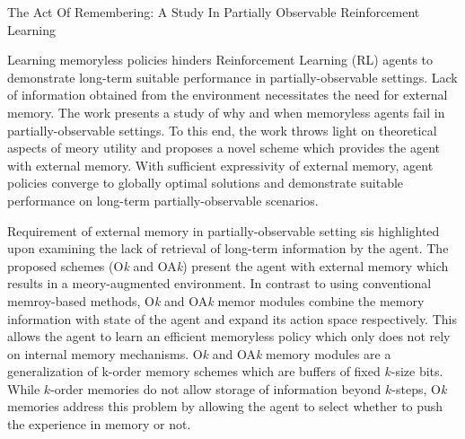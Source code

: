 \documentclass[11pt,letterpaper]{article}
\begin{document}
\begin{center}
  \large{The Act Of Remembering: A Study In Partially Observable Reinforcement Learning}
\end{center}

Learning memoryless policies hinders Reinforcement Learning (RL) agents to demonstrate long-term suitable performance in partially-observable settings. Lack of information obtained from the environment necessitates the need for external memory. The work presents a study of why and when memoryless agents fail in partially-observable settings. To this end, the work throws light on theoretical aspects of meory utility and proposes a novel scheme which provides the agent with external memory. With sufficient expressivity of external memory, agent policies converge to globally optimal solutions and demonstrate suitable performance on long-term partially-observable scenarios. 

Requirement of external memory in partially-observable setting sis highlighted upon examining the lack of retrieval of long-term information by the agent. The proposed schemes (O\textit{k} and OA\textit{k}) present the agent with external memory which results in a meory-augmented environment. In contrast to using conventional memroy-based methods, O\textit{k} and OA\textit{k} memor modules combine the memory information with state of the agent and expand its action space respectively. This allows the agent to learn an efficient memoryless policy which only does not rely on internal memory mechanisms. O\textit{k} and OA\textit{k} memory modules are a generalization of k-order memory schemes which are buffers of fixed $k$-size bits. While $k$-order memories do not allow storage of information beyond $k$-steps, O\textit{k} memories address this problem by allowing the agent to select whether to push the experience in memory or not.
\end{document}
